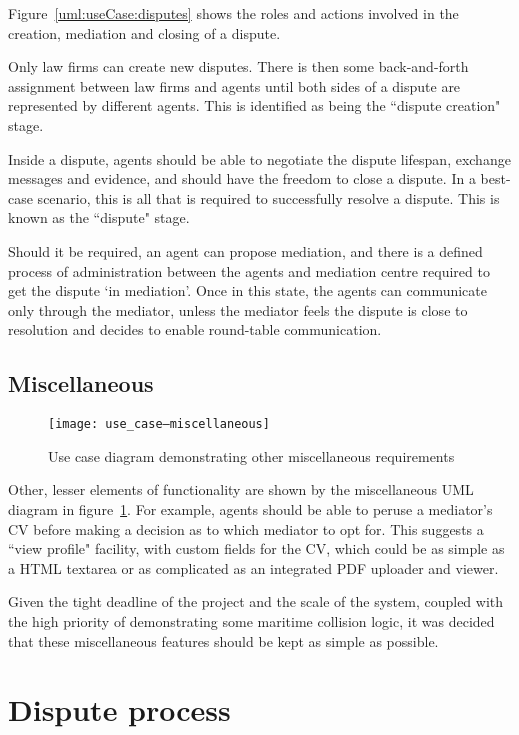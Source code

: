 Figure~\ref{uml:useCase:disputes} shows the roles and actions involved in the creation, mediation and closing of a dispute.

Only law firms can create new disputes. There is then some back-and-forth assignment between law firms and agents until both sides of a dispute are represented by different agents. This is identified as being the ``dispute creation" stage.

Inside a dispute, agents should be able to negotiate the dispute lifespan, exchange messages and evidence, and should have the freedom to close a dispute. In a best-case scenario, this is all that is required to successfully resolve a dispute. This is known as the ``dispute" stage.

Should it be required, an agent can propose mediation, and there is a defined process of administration between the agents and mediation centre required to get the dispute `in mediation'. Once in this state, the agents can communicate only through the mediator, unless the mediator feels the dispute is close to resolution and decides to enable round-table communication.

\subsection{Miscellaneous}

\begin{figure}[h!]
  \centering
    \ifimages
    \texttt{[image: use\_case--miscellaneous]}
    \fi
  \caption{Use case diagram demonstrating other miscellaneous requirements}
  \label{uml:useCase:miscellaneous}
\end{figure}

Other, lesser elements of functionality are shown by the miscellaneous UML diagram in figure~\ref{uml:useCase:miscellaneous}. For example, agents should be able to peruse a mediator's CV before making a decision as to which mediator to opt for. This suggests a ``view profile" facility, with custom fields for the CV, which could be as simple as a HTML textarea or as complicated as an integrated PDF uploader and viewer.

Given the tight deadline of the project and the scale of the system, coupled with the high priority of demonstrating some maritime collision logic, it was decided that these miscellaneous features should be kept as simple as possible.

\section{Dispute process}

